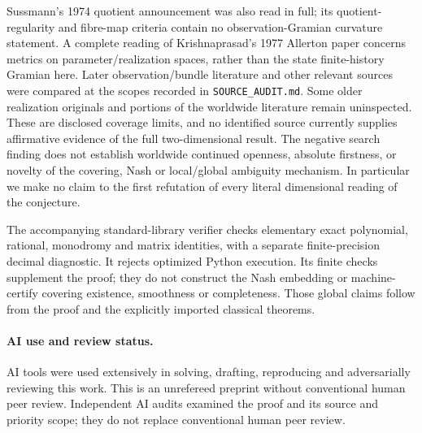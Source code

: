 \documentclass[11pt]{article}
\begin{document}
Sussmann's 1974 quotient announcement \cite{sussmann} was also read in full;
its quotient-regularity and fibre-map criteria contain no observation-Gramian
curvature statement. A complete reading of Krishnaprasad's 1977 Allerton paper
\cite{allerton} concerns metrics on parameter/realization spaces, rather than
the state finite-history Gramian here. Later observation/bundle literature and
other relevant sources were compared at the scopes recorded in
\texttt{SOURCE\_AUDIT.md}. Some older realization originals and portions of the
worldwide literature remain uninspected. These are disclosed coverage limits,
and no identified source currently supplies affirmative evidence of the full
two-dimensional result. The negative search finding does not establish
worldwide continued openness, absolute firstness, or novelty of the covering,
Nash or local/global ambiguity mechanism. In particular we make no claim to
the first refutation of every literal dimensional reading of the conjecture.

The accompanying standard-library verifier checks elementary exact polynomial,
rational, monodromy and matrix identities, with a separate finite-precision
decimal diagnostic. It rejects optimized Python execution. Its finite checks
supplement the proof; they do not construct the Nash embedding or
machine-certify covering existence, smoothness or completeness. Those global
claims follow from the proof and the explicitly imported classical theorems.

\paragraph{AI use and review status.}
AI tools were used extensively in solving, drafting, reproducing and
adversarially reviewing this work. This is an unrefereed preprint without conventional human peer review.
Independent AI audits examined the proof and its source and priority scope;
they do not replace conventional human peer review.
\end{document}

